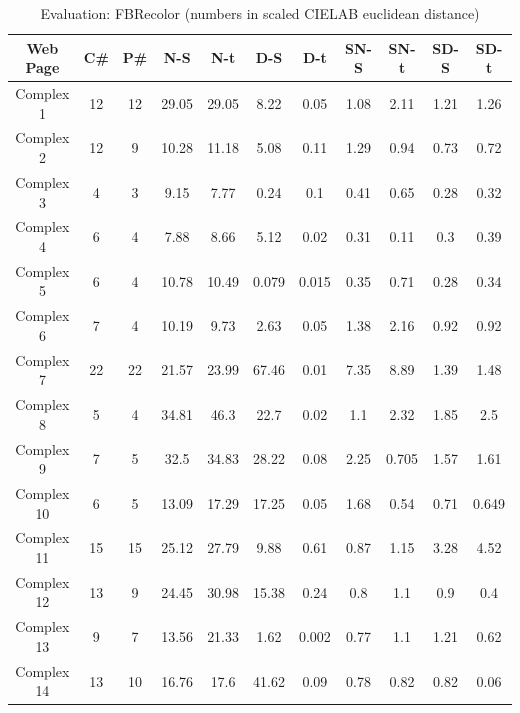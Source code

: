 \begin{table}[!htb]
\caption{Evaluation: FBRecolor (numbers in scaled CIELAB euclidean distance)}
\centering
\begin{tabular}{c c c c c c c c c c c}
\hline\hline
Web Page & C\# & P\# & N-S & N-t & D-S & D-t & SN-S & SN-t & SD-S & SD-t\\ [0.5ex]
\hline
Complex 1&12&12&29.05&29.05&8.22&0.05&1.08&2.11&1.21&1.26\\
Complex 2&12&9&10.28&11.18&5.08&0.11&1.29&0.94&0.73&0.72\\
Complex 3&4&3&9.15&7.77&0.24&0.1&0.41&0.65&0.28&0.32\\
Complex 4&6&4&7.88&8.66&5.12&0.02&0.31&0.11&0.3&0.39\\
Complex 5&6&4&10.78&10.49&0.079&0.015&0.35&0.71&0.28&0.34\\
Complex 6&7&4&10.19&9.73&2.63&0.05&1.38&2.16&0.92&0.92\\
Complex 7&22&22&21.57&23.99&67.46&0.01&7.35&8.89&1.39&1.48\\
Complex 8&5&4&34.81&46.3&22.7&0.02&1.1&2.32&1.85&2.5\\
Complex 9&7&5&32.5&34.83&28.22&0.08&2.25&0.705&1.57&1.61\\
Complex 10&6&5&13.09&17.29&17.25&0.05&1.68&0.54&0.71&0.649\\
Complex 11&15&15&25.12&27.79&9.88&0.61&0.87&1.15&3.28&4.52\\
Complex 12&13&9&24.45&30.98&15.38&0.24&0.8&1.1&0.9&0.4\\
Complex 13&9&7&13.56&21.33&1.62&0.002&0.77&1.1&1.21&0.62\\
Complex 14&13&10&16.76&17.6&41.62&0.09&0.78&0.82&0.82&0.06\\[1ex]
\hline
\end{tabular}
\label{table:nonlin}
\end{table}


